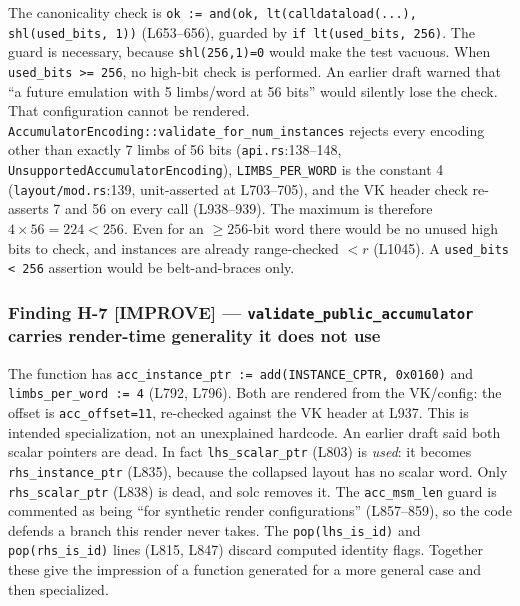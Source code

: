 The canonicality check is
\texttt{ok := and(ok, lt(calldataload(...), shl(used\_\allowbreak{}bits, 1))}
(L653--656), guarded by \texttt{if lt(used\_\allowbreak{}bits, 256)}. The guard
is necessary, because \texttt{shl(256,1)=0} would make the test
vacuous. When \texttt{used\_bits >= 256}, no high-bit check is
performed. An earlier draft warned that ``a future emulation with
5 limbs/word at 56 bits'' would silently lose the check.
 That configuration cannot be rendered.
\texttt{AccumulatorEncoding::validate\_\allowbreak{}for\_\allowbreak{}num\_\allowbreak{}instances} rejects
every encoding other than exactly 7 limbs of 56 bits
(\texttt{api.rs}:138--148, \texttt{UnsupportedAccumulatorEncoding}),
\texttt{LIMBS\_PER\_WORD} is the constant 4
(\texttt{layout/mod.rs}:139, unit-asserted at L703--705), and the
VK header check re-asserts 7 and 56 on every call (L938--939). The
maximum is therefore $4\times56=224<256$. Even for an $\ge256$-bit
word there would be no unused high bits to check, and instances are
already range-checked $<r$ (L1045). A \texttt{used\_bits < 256}
assertion would be belt-and-braces only.

\subsubsection*{Finding H-7 \textcolor{codegenblue}{[IMPROVE]} --- \texttt{validate\_\allowbreak{}public\_\allowbreak{}accumulator} carries render-time generality it does not use}

The function has \texttt{acc\_\allowbreak{}instance\_\allowbreak{}ptr := add(INSTANCE\_\allowbreak{}CPTR,
0x0160)} and \texttt{limbs\_\allowbreak{}per\_\allowbreak{}word := 4} (L792, L796). Both are
rendered from the VK/config: the offset is \texttt{acc\_offset=11},
re-checked against the VK header at L937. This is intended
specialization, not an unexplained hardcode. 
An earlier draft said both scalar pointers are dead. In fact
\texttt{lhs\_scalar\_ptr} (L803) is \emph{used}: it becomes
\texttt{rhs\_\allowbreak{}instance\_\allowbreak{}ptr} (L835), because the collapsed layout has
no scalar word. Only \texttt{rhs\_scalar\_ptr} (L838) is dead, and
solc removes it. The \texttt{acc\_msm\_len} guard is commented as
being ``for synthetic render configurations'' (L857--859), so the
code defends a branch this render never takes. The
\texttt{pop(lhs\_is\_id)} and \texttt{pop(rhs\_is\_id)} lines (L815,
L847) discard computed identity flags. Together these give the
impression of a function generated for a more general case and then
specialized.


